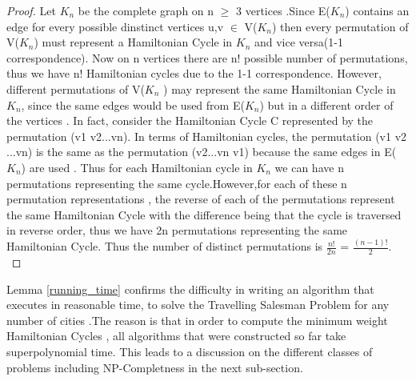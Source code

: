 \documentclass{article}
\begin{document}
\begin{proof}
Let $K_n$ be the complete graph on n $\geq$ 3 vertices .Since E($K_n$) contains an edge for every possible dinstinct vertices u,v $\in$ V($K_n$) then every permutation of V($K_n$) must represent a Hamiltonian Cycle in $K_n$ and vice versa(1-1 correspondence). Now on n vertices there are n! possible number of permutations, thus we have n! Hamiltonian cycles due to the 1-1 correspondence. However, different permutations of V($K_n$ ) may represent the same Hamiltonian Cycle in $K_n$, since the same edges would be used from E($K_n$) but in a different order of the vertices . In fact, consider the Hamiltonian Cycle C represented by the permutation (v1 v2...vn). In terms of Hamiltonian cycles, the permutation (v1 v2 ...vn) is the same as the permutation (v2...vn v1) because the same edges in E($K_n$) are used . Thus for each Hamiltonian cycle in $K_n$ we can have n permutations representing the same cycle.However,for each of these n permutation representations , the reverse of each of the permutations represent the same Hamiltonian Cycle with the difference being that the cycle is traversed in reverse order, thus we have 2n permutations representing the same Hamiltonian Cycle. Thus the number of distinct permutations is $\frac{n!}{2n}$ = $\frac{(n-1)!}{2}$. \cite{mathematics_stack_exchange_2012}
\end{proof}
Lemma \ref{running_time} confirms the difficulty in writing an algorithm that executes in reasonable time, to solve the Travelling Salesman Problem for any number of cities .The reason is that in order to compute the minimum weight Hamiltonian Cycles , all algorithms that were constructed so far take superpolynomial time. This leads to a discussion on the different classes of problems including NP-Completness in the next sub-section.
\end{document}
